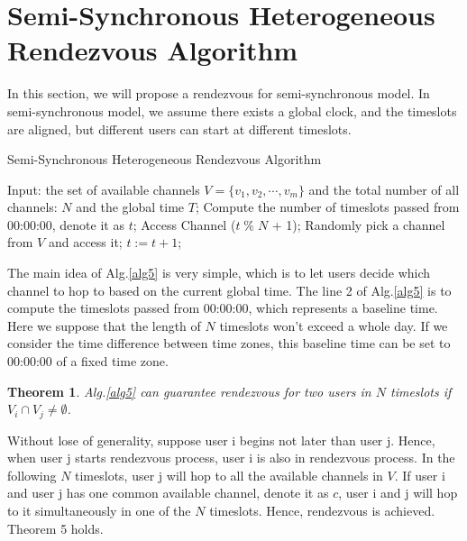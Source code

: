 \documentclass[10pt, conference, letterpaper]{IEEEtran}
\newtheorem{theorem}{Theorem}
\begin{document}
\section{Semi-Synchronous Heterogeneous Rendezvous Algorithm}

In this section, we will propose a rendezvous for semi-synchronous model. In semi-synchronous model, we assume there exists a global clock, and the timeslots are aligned, but different users can start at different timeslots.

\begin{algorithm}
\caption{Semi-Synchronous Heterogeneous Rendezvous Algorithm}
\label{alg5}
\begin{algorithmic}[1]
\STATE Input: the set of available channels $V=\{v_1,v_2,\cdots,v_m\}$ and the total number of all channels: $N$ and the global time $T$;
\STATE Compute the number of timeslots passed from 00:00:00, denote it as $t$;
\STATE Access Channel ($t\; \% \;N$ + 1);
\ELSE
\STATE Randomly pick a channel from $V$ and access it;
\ENDIF
\STATE $t:=t+1$;
\ENDWHILE
\end{algorithmic}
\end{algorithm}

The main idea of Alg.\ref{alg5} is very simple, which is to let users decide which channel to hop to based on the current global time. The line 2 of Alg.\ref{alg5} is to compute the timeslots passed from 00:00:00, which represents a baseline time. Here we suppose that the length of $N$ timeslots won't exceed a whole day. If we consider the time difference between time zones, this baseline time can be set to 00:00:00 of a fixed time zone.

\begin{theorem}
Alg.\ref{alg5} can guarantee rendezvous for two users in $N$ timeslots if $V_i \cap V_j \ne \emptyset$.
\end{theorem}

\begin{IEEEproof}
Without lose of generality, suppose user i begins not later than user j. Hence, when user j starts rendezvous process, user i is also in rendezvous process. In the following $N$ timeslots, user j will hop to all the available channels in $V$. If user i and user j has one common available channel, denote it as $c$, user i and j will hop to it simultaneously in one of the $N$ timeslots. Hence, rendezvous is achieved. Theorem 5 holds.
\end{IEEEproof}
\end{document}
